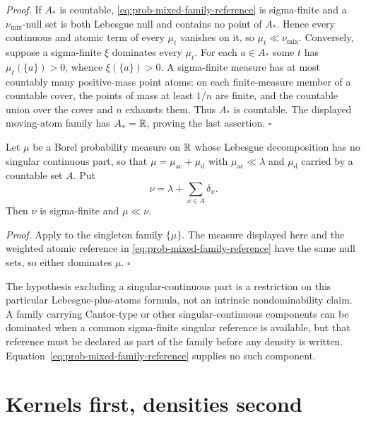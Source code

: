 \noindent\emph{Proof.} If $A_*$ is countable, \eqref{eq:prob-mixed-family-reference} is sigma-finite and a $\nu_{\mathrm{mix}}$-null set is both Lebesgue null and contains no point of $A_*$. Hence every continuous and atomic term of every $\mu_t$ vanishes on it, so $\mu_t\ll\nu_{\mathrm{mix}}$. Conversely, suppose a sigma-finite $\xi$ dominates every $\mu_t$. For each $a\in A_*$ some $t$ has $\mu_t(\{a\})>0$, whence $\xi(\{a\})>0$. A sigma-finite measure has at most countably many positive-mass point atoms: on each finite-measure member of a countable cover, the points of mass at least $1/n$ are finite, and the countable union over the cover and $n$ exhausts them. Thus $A_*$ is countable. The displayed moving-atom family has $A_*=\mathbb R$, proving the last assertion. \hfill$\square$

\medskip
{}
Let $\mu$ be a Borel probability measure on $\mathbb R$ whose Lebesgue decomposition has no singular continuous part, so that $\mu=\mu_{\mathrm{ac}}+\mu_{\mathrm d}$ with $\mu_{\mathrm{ac}}\ll\lambda$ and $\mu_{\mathrm d}$ carried by a countable set $A$. Put
\begin{equation}
\nu=\lambda+\sum_{x\in A}\delta_x .
\label{eq:prob-mixed-reference}
\end{equation}
Then $\nu$ is sigma-finite and $\mu\ll\nu$. 
\medskip

\noindent\emph{Proof.} Apply  to the singleton family $\{\mu\}$. The measure displayed here and the weighted atomic reference in \eqref{eq:prob-mixed-family-reference} have the same null sets, so either dominates $\mu$. \hfill$\square$

The hypothesis excluding a singular-continuous part is a restriction on this particular Lebesgue-plus-atoms formula, not an intrinsic nondominability claim. A family carrying Cantor-type or other singular-continuous components can be dominated when a common sigma-finite singular reference is available, but that reference must be declared as part of the family before any density is written. Equation~\eqref{eq:prob-mixed-family-reference} supplies no such component.

\section{Kernels first, densities second}
\label{sec:prob-kernels}

